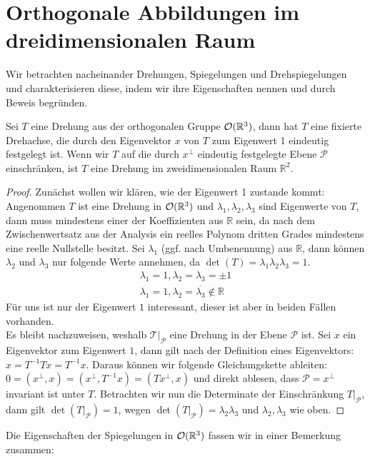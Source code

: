 \section{Orthogonale Abbildungen im dreidimensionalen Raum}
Wir betrachten nacheinander Drehungen, Spiegelungen und Drehspiegelungen und charakterisieren diese, indem wir ihre Eigenschaften nennen und durch Beweis begründen.
\begin{theorem}
Sei $T$ eine Drehung aus der orthogonalen Gruppe ${\mathcal{O}(\mathbb{R}^3)}$, dann hat $T$ eine fixierte Drehachse, die durch den Eigenvektor $x$ von $T$ zum Eigenwert 1 eindeutig festgelegt ist.
Wenn wir $T$ auf die durch $x^{\perp}$ eindeutig festgelegte Ebene $\mathcal{P}$ einschränken, ist $T$ eine Drehung im zweidimensionalen Raum $\mathbb{R}^2$.
\end{theorem}
\begin{proof}
Zunächst wollen wir klären, wie der Eigenwert 1 zustande kommt:
 Angenommen $T$ ist eine Drehung in ${\mathcal{O}(\mathbb{R}^3)}$ und $\lambda_1,\lambda_2,\lambda_3$ sind Eigenwerte von $T$, dann muss mindestens einer der Koeffizienten aus $\mathbb{R}$ sein, da nach dem Zwischenwertsatz aus der Analysis ein reelles Polynom dritten Grades mindestens eine reelle Nullstelle besitzt. Sei $\lambda_1$ (ggf. nach Umbenennung) aus $\mathbb{R}$, dann können $\lambda_2$ und $\lambda_3$ nur folgende Werte annehmen, da $\det(T)=\lambda_1\lambda_2\lambda_3=1$.
 \begin{align}
  \lambda_1=1, \lambda_2=\lambda_3=\pm1 \\
  \lambda_1=1, \lambda_2=\overline{\lambda_3}\notin \mathbb{R}
 \end{align}
Für uns ist nur der Eigenwert $1$ interessant, dieser ist aber in beiden Fällen vorhanden.\\
Es bleibt nachzuweisen, weshalb $\mathcal{T}|_\mathcal{P}$ eine Drehung in der Ebene $\mathcal{P}$ ist.
Sei $x$ ein Eigenvektor zum Eigenwert $1$, dann gilt nach der Definition eines Eigenvektors: $x=T^{-1}Tx=T^{-1}x$. Daraus können wir folgende Gleichungskette ableiten: $0=(x^{\perp},x)=(x^{\perp},T^{-1}x)=(Tx^{\perp},x)$ und direkt ablesen, dass $\mathcal{P}=x^{\perp}$ invariant ist unter $T$. Betrachten wir nun die Determinate der Einschränkung $T|_\mathcal{P}$, dann gilt $\det(T|_\mathcal{P})=1$, wegen $\det(T|_\mathcal{P}) = \lambda_2\lambda_3$ und $\lambda_2,\lambda_3$ wie oben.
\end{proof}
Die Eigenschaften der Spiegelungen in ${\mathcal{O}(\mathbb{R}^3)}$ fassen wir in einer Bemerkung zusammen:
